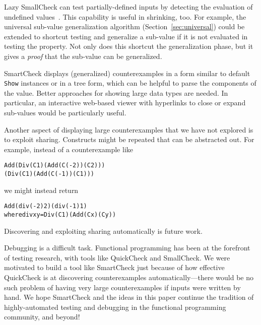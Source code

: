 \documentclass{sigplanconf}
\newenvironment{code}{\begin{alltt}\footnotesize}{\end{alltt}}
\newcommand{\ttp}[1]{\texttt{#1}}
\begin{document}
Lazy SmallCheck can test partially-defined inputs by detecting the evaluation of
undefined values~\cite{sc}.  This capability is useful in shrinking, too.  For
example, the universal sub-value generalization algorithm
(Section~\ref{sec:universal}) could be extended to shortcut testing and
generalize a sub-value if it is not evaluated in testing the property.  Not only
does this shortcut the generalization phase, but it gives a \emph{proof} that the
sub-value can be generalized.

SmartCheck displays (generalized) counterexamples in a form similar to default
\ttp{Show} instances or in a tree form, which can be helpful to parse the
components of the value.  Better approaches for showing large data types are
needed.  In particular, an interactive web-based viewer with hyperlinks to close
or expand sub-values would be particularly useful.

Another aspect of displaying large counterexamples that we have not explored is
to exploit sharing.  Constructs might be repeated that can be abstracted out.
For example, instead of a counterexample like
%
\begin{code}
Add (Div (C 1) (Add (C (-2)) (C 2)))
    (Div (C 1) (Add (C (-1)) (C 1)))
\end{code}
%
\noindent
we might instead return
%
\begin{code}
Add (div (-2) 2) (div (-1) 1)
  where div x y = Div (C 1) (Add (C x) (C y))
\end{code}
%
\noindent
Discovering and exploiting sharing automatically is future work.



Debugging is a difficult task.  Functional programming has been at the forefront
of testing research, with tools like QuickCheck and SmallCheck.  We were
motivated to build a tool like SmartCheck just because of how effective
QuickCheck is at discovering counterexamples automatically---there would be no
such problem of having very large counterexamples if inputs were written by
hand.  We hope SmartCheck and the ideas in this paper continue the tradition of
highly-automated testing and debugging in the functional programming community,
and beyond!
\end{document}
